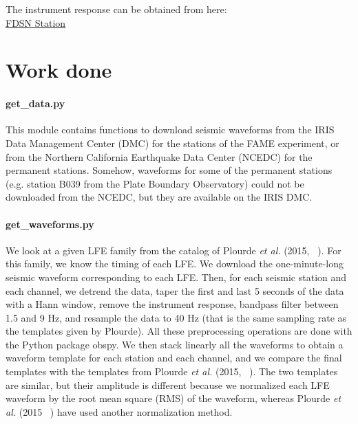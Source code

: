\documentclass[workdone.tex]{subfiles}
\begin{document}
The instrument response can be obtained from here: \\

\href{http://service.ncedc.org/fdsnws/station/1/#description-box}{FDSN Station}

\section{Work done}

\paragraph{get\_data.py} This module contains functions to download seismic waveforms from the IRIS Data Management Center (DMC) for the stations of the FAME experiment, or from the Northern California Earthquake Data Center (NCEDC) for the permanent stations. Somehow, waveforms for some of the permanent stations (e.g. station B039 from the Plate Boundary Observatory) could not be downloaded from the NCEDC, but they are available on the IRIS DMC.

\paragraph{get\_waveforms.py} We look at a given LFE family from the catalog of Plourde \textit{et al.} (2015, ~\cite{PLO_2015}). For this family, we know the timing of each LFE. We download the one-minute-long seismic waveform corresponding to each LFE. Then, for each seismic station and each channel, we detrend the data, taper the first and last 5 seconds of the data with a Hann window, remove the instrument response, bandpass filter between 1.5 and 9 Hz, and resample the data to 40 Hz (that is the same sampling rate as the templates given by Plourde). All these preprocessing operations are done with the Python package obspy. We then stack linearly all the waveforms to obtain a waveform template for each station and each channel, and we compare the final templates with the templates from Plourde \textit{et al.} (2015, ~\cite{PLO_2015}). The two templates are similar, but their amplitude is different because we normalized each LFE waveform by the root mean square (RMS) of the waveform, whereas Plourde \textit{et al.} (2015 ~\cite{PLO_2015}) have used another normalization method.
\end{document}
